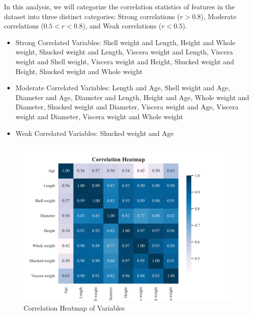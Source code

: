 \documentclass{article}
\begin{document}
\begin{minipage}[t]{0.5\linewidth}
    In this analysis, we will categorize the correlation statistics of features in the dataset into three distinct categories: Strong correlations ($r>0.8$), Moderate correlations ($0.5<r<0.8$), and Weak correlations ($r<0.5$).

\begin{itemize}
\item Strong Correlated Variables: Shell weight and Length, Height and Whole weight, Shucked weight and Length, Viscera weight and Length, Viscera weight and Shell weight, Viscera weight and Height, Shucked weight and Height, Shucked weight and Whole weight
\item Moderate Correlated Variables: Length and Age, Shell weight and Age, Diameter and Age, Diameter and Length, Height and Age, Whole weight and Diameter, Shucked weight and Diameter, Viscera weight and Age, Viscera weight and Diameter, Viscera weight and Whole weight
\item Weak Correlated Variables: Shucked weight and Age
\end{itemize}
\vfill
\end{minipage}
\hfill
\begin{minipage}[t]{0.5\linewidth}
    \begin{figure}[H]
        \centering
        \vspace{-1.5cm}
        \includegraphics[width=\linewidth]{data/dataset/Abalone/output_graph/eda_corr.jpg}
        \caption{\label{fig:corr}Correlation Heatmap of Variables}
    \end{figure}
\end{minipage}
\end{document}
